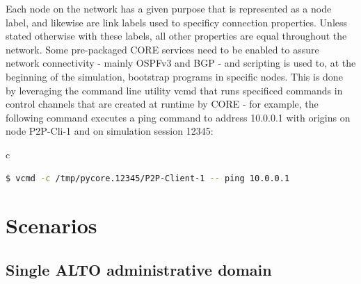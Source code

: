     Each node on the network has a given purpose that is represented as a node label, and likewise are link labels used to specificy connection properties.
    Unless stated otherwise with these labels, all other properties are equal throughout the network.
    Some pre-packaged CORE services need to be enabled to assure network connectivity - mainly OSPFv3 and BGP - and scripting is used to, at the beginning of the simulation, bootstrap programs in specific nodes.
    This is done by leveraging the command line utility vcmd that runs specificed commands in control channels that are created at runtime by CORE - for example, the following command executes a ping command to address 10.0.0.1 with origins on node P2P-Cli-1 and on simulation session 12345:

    \begin{center}
    \begin{tabular}{c}
    \begin{lstlisting}[caption=Execution of an example command through the control channel of a given node, language=bash]
        $ vcmd -c /tmp/pycore.12345/P2P-Client-1 -- ping 10.0.0.1
    \end{lstlisting}
    \end{tabular}
    \end{center}

\section{Scenarios}

\subsection{Single ALTO administrative domain}
